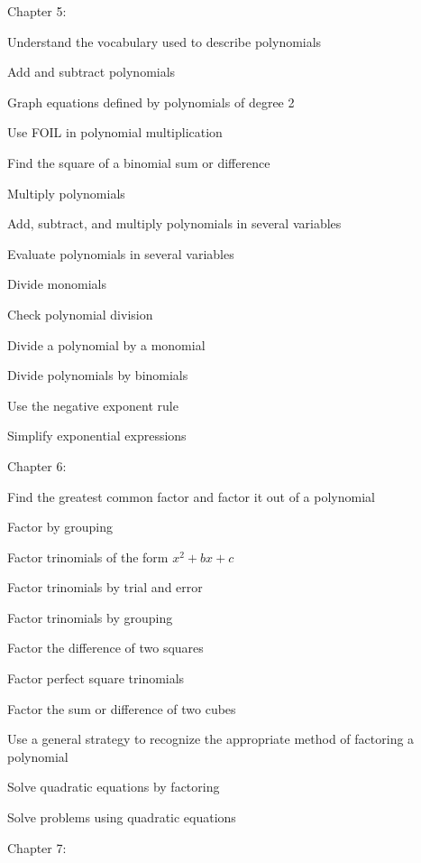 Chapter 5:
 \begin{alphalist}
    \item Understand the vocabulary used to describe polynomials
    \item Add and subtract polynomials
    \item Graph equations defined by polynomials of degree 2
    \item Use FOIL in polynomial multiplication
    \item Find the square of a binomial sum or difference
    \item Multiply polynomials
    \item Add, subtract, and multiply polynomials in several variables
    \item Evaluate polynomials in several variables
    \item Divide monomials
    \item Check polynomial division
    \item Divide a polynomial by a monomial 
    \item Divide polynomials by binomials
    \item Use the negative exponent rule
    \item Simplify exponential expressions
 \end{alphalist}
Chapter 6:
 \begin{alphalist}
    \item Find the greatest common factor and factor it out of a polynomial
    \item Factor by grouping
    \item Factor trinomials of the form $x^2 + bx + c$
    \item Factor trinomials by trial and error
    \item Factor trinomials by grouping
    \item Factor the difference of two squares
    \item Factor perfect square trinomials
    \item Factor the sum or difference of two cubes
    \item Use a general strategy to recognize the appropriate method of factoring a polynomial
    \item Solve quadratic equations by factoring
    \item Solve problems using quadratic equations
 \end{alphalist}
Chapter 7:
